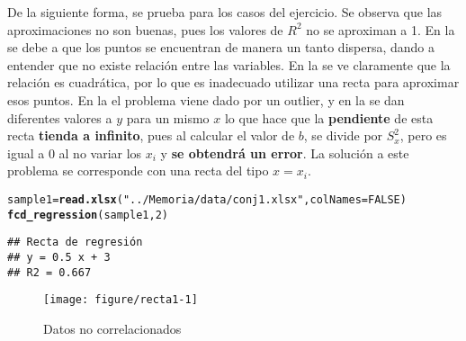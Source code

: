 \documentclass[12pt]{report}\usepackage[]{graphicx}\usepackage[dvipsnames]{xcolor}
\makeatletter
\def\maxwidth{ %
  \ifdim\Gin@nat@width>\linewidth
    \linewidth
  \else
    \Gin@nat@width
  \fi
}
\newcommand{\hlnum}[1]{\textcolor[rgb]{0.686,0.059,0.569}{#1}}%
\newcommand{\hlstr}[1]{\textcolor[rgb]{0.192,0.494,0.8}{#1}}%
\newcommand{\hlstd}[1]{\textcolor[rgb]{0.345,0.345,0.345}{#1}}%
\newcommand{\hlkwb}[1]{\textcolor[rgb]{0.69,0.353,0.396}{#1}}%
\newcommand{\hlkwc}[1]{\textcolor[rgb]{0.333,0.667,0.333}{#1}}%
\newcommand{\hlkwd}[1]{\textcolor[rgb]{0.737,0.353,0.396}{\textbf{#1}}}%
\newenvironment{kframe}{%
 \def\at@end@of@kframe{}%
 \ifinner\ifhmode%
  \def\at@end@of@kframe{\end{minipage}}%
  \begin{minipage}{\columnwidth}%
 \fi\fi%
 \def\FrameCommand##1{\hskip\@totalleftmargin \hskip-\fboxsep
 \colorbox{shadecolor}{##1}\hskip-\fboxsep
     \hskip-\linewidth \hskip-\@totalleftmargin \hskip\columnwidth}%
 \MakeFramed {\advance\hsize-\width
   \@totalleftmargin\z@ \linewidth\hsize
   \@setminipage}}%
 {\par\unskip\endMakeFramed%
 \at@end@of@kframe}
\newenvironment{knitrout}{}{} %
\makeatother
\begin{document}
 				De la siguiente forma, se prueba para los casos del ejercicio. Se observa que las aproximaciones no son buenas, pues los valores de $R^2$ no se aproximan a 1. En la  se debe a que los puntos se encuentran de manera un tanto dispersa, dando a entender que no existe relación entre las variables. En la  se ve claramente que la relación es cuadrática, por lo que es inadecuado utilizar una recta para aproximar esos puntos. En la  el problema viene dado por un outlier, y en la  se dan diferentes valores a $y$ para un mismo $x$ lo que hace que la \textbf{pendiente} de esta recta \textbf{tienda a infinito}, pues al calcular el valor de $b$, se divide por $S^2_x$, pero es igual a 0 al no variar los $x_i$ y \textbf{se obtendrá un error}. La solución a este problema se corresponde con una recta del tipo $x=x_i$. 
 				
\begin{knitrout}
\color{fgcolor}\begin{kframe}
\begin{alltt}
\hlstd{sample1} \hlkwb{=} \hlkwd{read.xlsx}\hlstd{(}\hlstr{"../Memoria/data/conj1.xlsx"}\hlstd{,} \hlkwc{colNames}\hlstd{=}\hlnum{FALSE}\hlstd{)}
\hlkwd{fcd_regression}\hlstd{(sample1,} \hlnum{2}\hlstd{)}
\end{alltt}
\begin{verbatim}
## Recta de regresión
## y = 0.5 x + 3 
## R2 = 0.667
\end{verbatim}
\end{kframe}\begin{figure}[H]

{\centering \texttt{[image: figure/recta1-1]} 

}

\caption[Datos no correlacionados]{Datos no correlacionados}\label{fig:recta1}
\end{figure}

\end{knitrout}
 				
\end{document}
